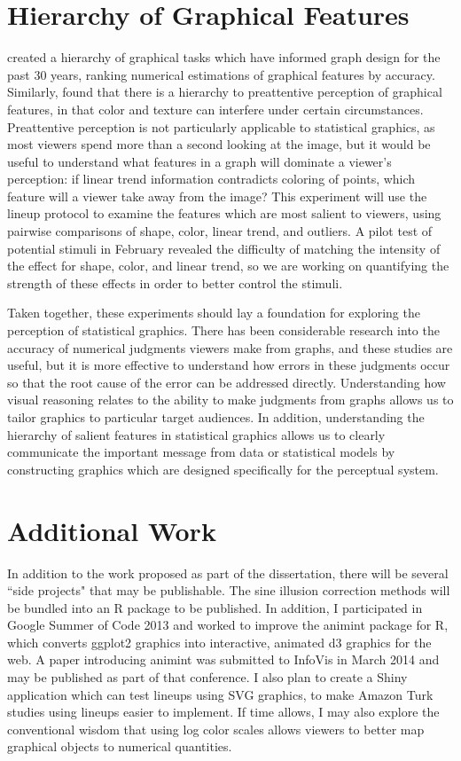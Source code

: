 \documentclass[11pt]{isuthesis}\usepackage[]{graphicx}\usepackage[]{color}
\begin{document}
\section{Hierarchy of Graphical Features}
\citet{cleveland:1984} created a hierarchy of graphical tasks which have informed graph design for the past 30 years, ranking numerical estimations of graphical features by accuracy. Similarly, \citet{healey1999large} found that there is a hierarchy to preattentive perception of graphical features, in that color and texture can interfere under certain circumstances. Preattentive perception is not particularly applicable to statistical graphics, as most viewers spend more than a second looking at the image, but it would be useful to understand what features in a graph will dominate a viewer's perception: if linear trend information contradicts coloring of points, which feature will a viewer take away from the image? This experiment will use the lineup protocol to examine the features which are most salient to viewers, using pairwise comparisons of shape, color, linear trend, and outliers. A pilot test of potential stimuli in February revealed the difficulty of matching the intensity of the effect for shape, color, and linear trend, so we are working on quantifying the strength of these effects in order to better control the stimuli.

Taken together, these experiments should lay a foundation for exploring the perception of statistical graphics. There has been considerable research into the accuracy of numerical judgments viewers make from graphs, and these studies are useful, but it is more effective to understand how errors in these judgments occur so that the root cause of the error can be addressed directly. Understanding how visual reasoning relates to the ability to make judgments from graphs allows us to tailor graphics to particular target audiences. In addition, understanding the hierarchy of salient features in statistical graphics allows us to clearly communicate the important message from data or statistical models by constructing graphics which are designed specifically for the perceptual system. 

\section{Additional Work} 
In addition to the work proposed as part of the dissertation, there will be several ``side projects" that may be publishable. The sine illusion correction methods will be bundled into an R package to be published. In addition, I participated in Google Summer of Code 2013 and worked to improve the animint package for R, which converts ggplot2 graphics into interactive, animated d3 graphics for the web. A paper introducing animint was submitted to InfoVis in March 2014 and may be published as part of that conference. I also plan to create a Shiny application which can test lineups using SVG graphics, to make Amazon Turk studies using lineups easier to implement. If time allows, I may also explore the conventional wisdom that using log color scales allows viewers to better map graphical objects to numerical quantities. 
\end{document}
